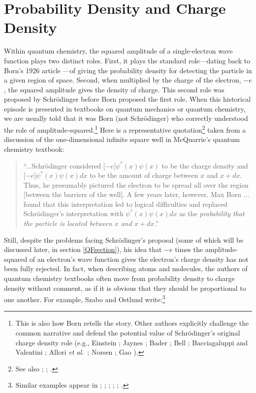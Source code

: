 \documentclass[onecolumn,secnumarabic,amsmath,amssymb,balancelastpage,nofootinbib]{article}
\begin{document}
\section{Probability Density and Charge Density}\label{PCsection}

Within quantum chemistry, the squared amplitude of a single-electron wave function plays two distinct roles.  First, it plays the standard role---dating back to Born's 1926 article \cite{born1926}---of giving the probability density for detecting the particle in a given region of space.  Second, when multiplied by the charge of the electron, $-e$, the squared amplitude gives the density of charge.  This second role was proposed by Schr\"{o}dinger \cite{schrodinger1926pt3, schrodinger1926pt4, schrodinger1926rev, schrodinger1928report, schrodingerletter} before Born proposed the first role.  When this historical episode is presented in textbooks on quantum mechanics or quantum chemistry, we are usually told that it was Born (not Schr\"{o}dinger) who correctly understood the role of amplitude-squared.\footnote{This is also how Born \cite{born1955} retells the story.  Other authors explicitly challenge the common narrative and defend the potential value of Schr\"{o}dinger's original charge density role (e.g., Einstein \cite[pg.\ 168--169]{einstein1934}; Jaynes \cite{jaynes1973}; Bader \cite{bader1990, bader2003, bader2010}; Bell \cite[pg.\ 39--40]{bell1990}; Bacciagaluppi and Valentini \cite[ch.\ 4]{bacciagaluppi2009}; Allori \emph{et al.}\ \cite{allori2011}; Norsen \cite[ch.\ 5]{norsen2017}; Gao \cite{gao2017, gao2018}).}  Here is a representative quotation\footnote{See also \cite[sec.\ 3.6]{gillespie2001}; \cite[ch.\ 17]{longair2013}; \cite[pg.\ 10, 147, 460]{levineQC}.} taken from a discussion of the one-dimensional infinite square well in McQuarrie's quantum chemistry textbook:
\begin{quote}
``...Schr\"{o}dinger considered [$-e$]$\psi^*(x)\psi(x)$ to be the charge density and [$-e$]$\psi^*(x)\psi(x)dx$ to be the amount of charge between $x$ and $x+dx$.  Thus, he presumably pictured the electron to be spread all over the region [between the barriers of the well].  A few years later, however, Max Born ... found that this interpretation led to logical difficulties and replaced Schr\"{o}dinger's interpretation with $\psi^*(x)\psi(x)dx$ as the \emph{probability that the particle is located between $x$ and $x+dx$}.'' \cite[pg.\ 104]{mcquarrieQC}
\end{quote}
Still, despite the problems facing Schr\"{o}dinger's proposal (some of which will be discussed later, in section \ref{QFsection}), his idea that $-e$ times the amplitude-squared of an electron's wave function gives the electron's charge density has not been fully rejected.  In fact, when describing atoms and molecules, the authors of quantum chemistry textbooks often move from probability density to charge density without comment, as if it is obvious that they should be proportional to one another.  For example, Szabo and Ostlund write:\footnote{Similar examples appear in \cite[pg.\ 151]{szaboQC}; \cite[pg.\ 6]{bader1990}; \cite[pg.\ 771]{shusterman1997}; \cite[pg.\ 1141]{matta2002}; \cite[pg.\ 223]{atkins2011}; \cite[pg.\ 403, 460]{levineQC}.}
\end{document}
